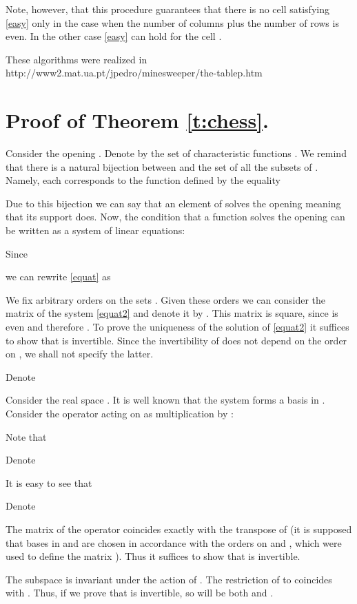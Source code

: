\documentclass[english,12pt]{article}
\theoremstyle{remark}
\theoremstyle{definition}
\theoremstyle{definition}
\begin{document}
    Note, however, that this procedure guarantees that there is no
    cell satisfying \eqref{easy} only in the case when the number of
    columns plus the number of rows is even. In the other case \eqref{easy} can hold for the
    cell .

These algorithms were realized in \\
http://www2.mat.ua.pt/jpedro/minesweeper/the-tablep.htm



\section{Proof of Theorem \ref{t:chess}.}


Consider the opening . Denote by  the set of characteristic functions
. We remind that there is a natural bijection between  and
the set of all the subsets of . Namely, each  corresponds to
the function  defined by the equality

Due to this bijection we can say that an element of  solves the opening meaning that
its support does. Now, the condition that a function  solves the opening 
can be written as a system of linear equations:


Since

we can rewrite \eqref{equat} as

We fix arbitrary orders on the sets . Given these orders we can consider the
matrix of the system \ref{equat2} and denote it by . This matrix is square, since  is even
and therefore . To prove the uniqueness of the solution of \eqref{equat2} it
suffices to show that  is invertible. Since the invertibility of  does not depend on the
order on , we shall not specify the latter.

Denote


Consider the real space . It is well known that the system  forms a basis in . Consider the operator  acting on  as
multiplication by :

Note that

Denote


It is easy to see that

Denote

The matrix of the operator  coincides exactly with the transpose of  (it is supposed
that bases in  and  are chosen in accordance with the orders on  and , which were used to define the matrix ). Thus it suffices to show that  is
invertible.

The subspace  is invariant under the action of . The restriction of  to 
coincides with . Thus, if we prove that  is invertible, so will be both 
and .
\end{document}
